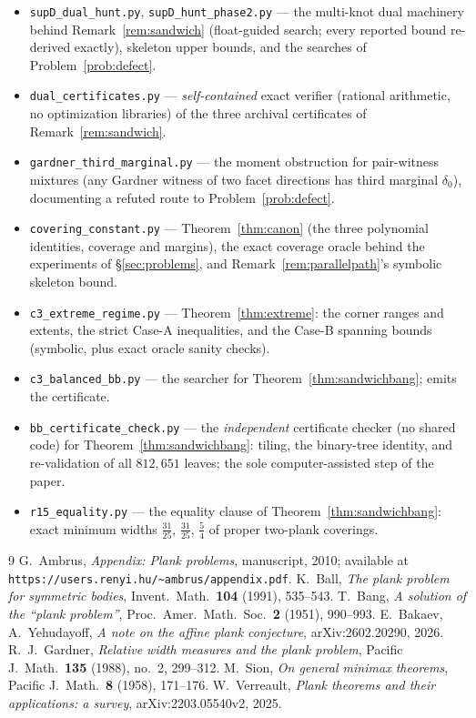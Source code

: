 \documentclass[11pt,reqno]{amsart}
\theoremstyle{plain}
\theoremstyle{definition}
\theoremstyle{remark}
\begin{document}
\begin{itemize}
\item\texttt{supD\_dual\_hunt.py}, \texttt{supD\_hunt\_phase2.py} ---
the multi-knot dual machinery behind Remark~\ref{rem:sandwich}
(float-guided search; every reported bound re-derived exactly), skeleton
upper bounds, and the searches of Problem~\ref{prob:defect}.
\item\texttt{dual\_certificates.py} --- \emph{self-contained} exact
verifier (rational arithmetic, no optimization libraries) of the three
archival certificates of Remark~\ref{rem:sandwich}.
\item\texttt{gardner\_third\_marginal.py} --- the moment obstruction for
pair-witness mixtures (any Gardner witness of two facet directions has
third marginal $\delta_0$), documenting a refuted route to
Problem~\ref{prob:defect}.
\item\texttt{covering\_constant.py} --- Theorem~\ref{thm:canon} (the three
polynomial identities, coverage and margins), the exact coverage oracle
behind the experiments of \S\ref{sec:problems}, and
Remark~\ref{rem:parallelpath}'s symbolic skeleton bound.
\item\texttt{c3\_extreme\_regime.py} --- Theorem~\ref{thm:extreme}: the corner
ranges and extents, the strict Case-A inequalities, and the Case-B spanning
bounds (symbolic, plus exact oracle sanity checks).
\item\texttt{c3\_balanced\_bb.py} --- the searcher for
Theorem~\ref{thm:sandwichbang}; emits the certificate.
\item\texttt{bb\_certificate\_check.py} --- the \emph{independent} certificate
checker (no shared code) for Theorem~\ref{thm:sandwichbang}: tiling, the
binary-tree identity, and re-validation of all $812{,}651$ leaves; the sole
computer-assisted step of the paper.
\item\texttt{r15\_equality.py} --- the equality clause of
Theorem~\ref{thm:sandwichbang}: exact minimum widths $\tfrac{31}{25}$,
$\tfrac{31}{25}$, $\tfrac54$ of proper two-plank coverings.
\end{itemize}

\begin{thebibliography}{9}
 G.\ Ambrus, \emph{Appendix: Plank problems}, manuscript,
2010; available at \texttt{https://users.renyi.hu/\~{}ambrus/appendix.pdf}.
 K.\ Ball, \emph{The plank problem for symmetric bodies},
Invent.\ Math.\ \textbf{104} (1991), 535--543.
 T.\ Bang, \emph{A solution of the ``plank problem''},
Proc.\ Amer.\ Math.\ Soc.\ \textbf{2} (1951), 990--993.
 E.\ Bakaev, A.\ Yehudayoff, \emph{A note on the affine plank
conjecture}, arXiv:2602.20290, 2026.
 R.\ J.\ Gardner, \emph{Relative width measures and the plank
problem}, Pacific J.\ Math.\ \textbf{135} (1988), no.\ 2, 299--312.
 M.\ Sion, \emph{On general minimax theorems}, Pacific J.\
Math.\ \textbf{8} (1958), 171--176.
 W.\ Verreault, \emph{Plank theorems and their applications: a
survey}, arXiv:2203.05540v2, 2025.
\end{thebibliography}
\end{document}
